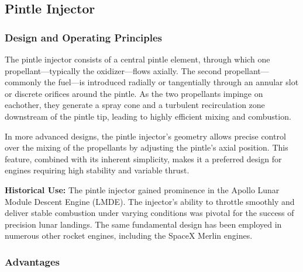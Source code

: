 \subsection{Pintle Injector}

\subsubsection{Design and Operating Principles}

The pintle injector consists of a central pintle element, through which one propellant—typically the oxidizer—flows axially. The second propellant—commonly the fuel—is introduced radially or tangentially through an annular slot or discrete orifices around the pintle. As the two propellants impinge on eachother, they generate a spray cone and a turbulent recirculation zone downstream of the pintle tip, leading to highly efficient mixing and combustion.

In more advanced designs, the pintle injector's geometry allows precise control over the mixing of the propellants by adjusting the pintle's axial position. This feature, combined with its inherent simplicity, makes it a preferred design for engines requiring high stability and variable thrust.

\textbf{Historical Use:} The pintle injector gained prominence in the Apollo Lunar Module Descent Engine (LMDE). The injector's ability to throttle smoothly and deliver stable combustion under varying conditions was pivotal for the success of precision lunar landings. The same fundamental design has been employed in numerous other rocket engines, including the SpaceX Merlin engines.



\subsubsection{Advantages}

